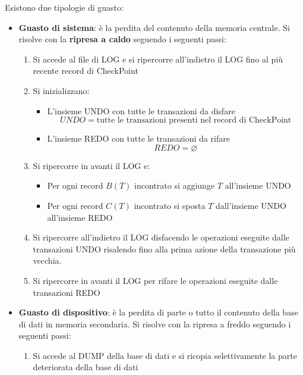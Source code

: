 \documentclass[a4paper]{article}
\begin{document}
\vspace{1em}
\noindent
Esistono due tipologie di guasto:
\begin{itemize}
  \item \textbf{Guasto di sistema}: è la perdita del contenuto della memoria centrale.
    Si risolve con la \textbf{ripresa a caldo} seguendo i seguenti passi:
    \begin{enumerate}
      \item Si accede al file di LOG e si ripercorre all'indietro il LOG fino al più
        recente record di CheckPoint

      \item Si inizializzano:
        \begin{itemize}
          \item L'insieme UNDO con tutte le transazioni da disfare
            \[
              UNDO = \text{tutte le transazioni presenti nel record di CheckPoint}
            \] 
          \item L'insieme REDO con tutte le transazioni da rifare
            \[
              REDO = \varnothing
            \] 
        \end{itemize}

      \item Si ripercorre in avanti il LOG e:
        \begin{itemize}
          \item Per ogni record \( B(T) \) incontrato si aggiunge \( T \) all'insieme
            UNDO

          \item Per ogni record \( C(T) \) incontrato si sposta \( T \) dall'insieme UNDO
            all'insieme REDO
        \end{itemize}

      \item Si ripercorre all'indietro il LOG disfacendo le operazioni eseguite dalle
        transazioni UNDO risalendo fino alla prima azione della transazione più vecchia.

      \item Si ripercorre in avanti il LOG per rifare le operazioni eseguite dalle
        transazioni REDO
    \end{enumerate}

  \item \textbf{Guasto di dispositivo}: è la perdita di parte o tutto il contenuto
    della base di dati in memoria secondaria. Si risolve con la ripresa a freddo
    seguendo i seguenti passi:
    \begin{enumerate}
      \item Si accede al DUMP della base di dati e si ricopia selettivamente la parte
        deteriorata della base di dati


\end{enumerate}
\end{itemize}
\end{document}
